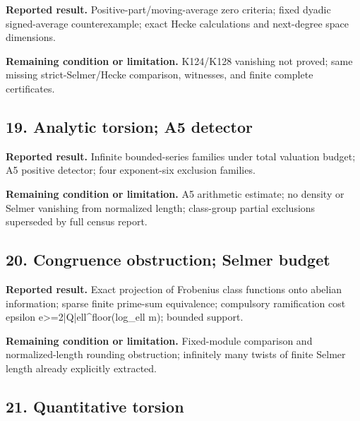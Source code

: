 \textbf{Reported result.} Positive-part/moving-average zero criteria; fixed dyadic signed-average counterexample; exact Hecke calculations and next-degree space dimensions.

\textbf{Remaining condition or limitation.} K124/K128 vanishing not proved; same missing strict-Selmer/Hecke comparison, witnesses, and finite complete certificates.

\subsection*{19. Analytic torsion; A5 detector}

\href{https://github.com/VladimirReshetnikov/ProveIt/blob/274841c1cb137aafbb60ab5f519c51fd42eee98e/docs/incoming/grh_method_transfers_2026-11-25%281%29.zip}{\file{grh_method_transfers_2026-11-25(1).zip}}

\textbf{Reported result.} Infinite bounded-series families under total valuation budget; A5 positive detector; four exponent-six exclusion families.

\textbf{Remaining condition or limitation.} A5 arithmetic estimate; no density or Selmer vanishing from normalized length; class-group partial exclusions superseded by full census report.

\subsection*{20. Congruence obstruction; Selmer budget}

\href{https://github.com/VladimirReshetnikov/ProveIt/blob/274841c1cb137aafbb60ab5f519c51fd42eee98e/docs/incoming/grh_method_transfers_2026-11-25.zip}{}

\textbf{Reported result.} Exact projection of Frobenius class functions onto abelian information; sparse finite prime-sum equivalence; compulsory ramification cost epsilon e>=2|Q|ell\textasciicircum{}floor(log\_ell m); bounded support.

\textbf{Remaining condition or limitation.} Fixed-module comparison and normalized-length rounding obstruction; infinitely many twists of finite Selmer length already explicitly extracted.

\subsection*{21. Quantitative torsion}

\href{https://github.com/VladimirReshetnikov/ProveIt/blob/274841c1cb137aafbb60ab5f519c51fd42eee98e/docs/incoming/grh_quantitative_twists_2026-11-25.zip}{}

